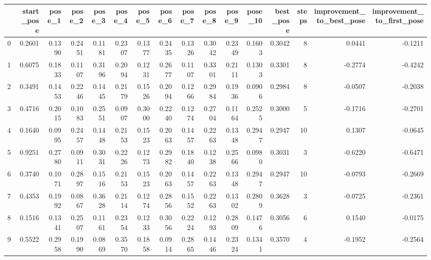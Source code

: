 \begin{tabular}{lrrrrrrrrrrrrrrr}
\toprule
{} &  start\_pose &  pose\_1 &  pose\_2 &  pose\_3 &  pose\_4 &  pose\_5 &  pose\_6 &  pose\_7 &  pose\_8 &  pose\_9 &  pose\_10 &  best\_pose &  steps &  improvement\_to\_best\_pose &  improvement\_to\_first\_pose \\
\midrule
0  &      0.2601 &  0.1390 &  0.2451 &  0.1181 &  0.2307 &  0.1377 &  0.2435 &  0.1326 &  0.3042 &  0.2349 &   0.1603 &     0.3042 &      8 &                    0.0441 &                    -0.1211 \\
1  &      0.6075 &  0.1833 &  0.1107 &  0.3196 &  0.2094 &  0.1231 &  0.2677 &  0.1107 &  0.3301 &  0.2111 &   0.1303 &     0.3301 &      8 &                   -0.2774 &                    -0.4242 \\
2  &      0.3491 &  0.1453 &  0.2246 &  0.1445 &  0.2179 &  0.1526 &  0.2094 &  0.1266 &  0.2984 &  0.1936 &   0.0906 &     0.2984 &      8 &                   -0.0507 &                    -0.2038 \\
3  &      0.4716 &  0.2015 &  0.1083 &  0.2551 &  0.0907 &  0.3000 &  0.2240 &  0.1274 &  0.2704 &  0.1164 &   0.2525 &     0.3000 &      5 &                   -0.1716 &                    -0.2701 \\
4  &      0.1640 &  0.0995 &  0.2457 &  0.1448 &  0.2153 &  0.1523 &  0.2063 &  0.1457 &  0.2263 &  0.1348 &   0.2947 &     0.2947 &     10 &                    0.1307 &                    -0.0645 \\
5  &      0.9251 &  0.2780 &  0.0911 &  0.3031 &  0.2226 &  0.1273 &  0.2982 &  0.1840 &  0.1238 &  0.2566 &   0.0980 &     0.3031 &      3 &                   -0.6220 &                    -0.6471 \\
6  &      0.3740 &  0.1071 &  0.2897 &  0.1516 &  0.2153 &  0.1523 &  0.2063 &  0.1457 &  0.2263 &  0.1348 &   0.2947 &     0.2947 &     10 &                   -0.0793 &                    -0.2669 \\
7  &      0.4353 &  0.1992 &  0.0867 &  0.3628 &  0.2114 &  0.1274 &  0.2856 &  0.1552 &  0.2263 &  0.1302 &   0.2809 &     0.3628 &      3 &                   -0.0725 &                    -0.2361 \\
8  &      0.1516 &  0.1341 &  0.2507 &  0.1161 &  0.2354 &  0.1233 &  0.3056 &  0.2224 &  0.1293 &  0.2809 &   0.1476 &     0.3056 &      6 &                    0.1540 &                    -0.0175 \\
9  &      0.5522 &  0.2958 &  0.1990 &  0.0869 &  0.3570 &  0.1858 &  0.0914 &  0.2865 &  0.1446 &  0.2324 &   0.1341 &     0.3570 &      4 &                   -0.1952 &                    -0.2564 \\

\end{tabular}
